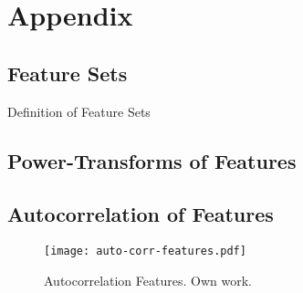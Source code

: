 \section{Appendix}


\subsection{Feature Sets}
\label{app:feature-sets}

\begin{table}[H]
    \centering
    
    \caption[Overview of Feature Sets]{Definition of Feature Sets}
    \label{tab:feature-set-definition}
\end{table}

\newpage

\newpage
\subsection{Power-Transforms of Features}
\label{app:power-transforms-of-features}

\newpage
\subsection{Autocorrelation of Features}
\label{app:autocorrelation-of-features}

\begin{figure}[ht]
    \centering
    \texttt{[image: auto-corr-features.pdf]}
    \caption[Autocorrelation of Features]{Autocorrelation Features. Own work.}
    \label{fig:auto-correlation-features}
\end{figure}



